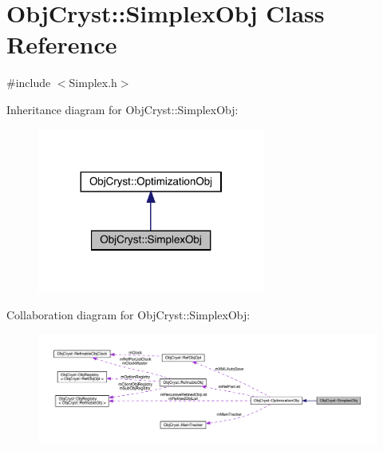 \hypertarget{class_obj_cryst_1_1_simplex_obj}{}\section{Obj\+Cryst\+::Simplex\+Obj Class Reference}
\label{class_obj_cryst_1_1_simplex_obj}


{\ttfamily \#include $<$Simplex.\+h$>$}



Inheritance diagram for Obj\+Cryst\+::Simplex\+Obj\+:
\nopagebreak
\begin{figure}[H]
\begin{center}
\leavevmode
\includegraphics[width=212pt]{class_obj_cryst_1_1_simplex_obj__inherit__graph}
\end{center}
\end{figure}


Collaboration diagram for Obj\+Cryst\+::Simplex\+Obj\+:
\nopagebreak
\begin{figure}[H]
\begin{center}
\leavevmode
\includegraphics[width=350pt]{class_obj_cryst_1_1_simplex_obj__coll__graph}
\end{center}
\end{figure}
